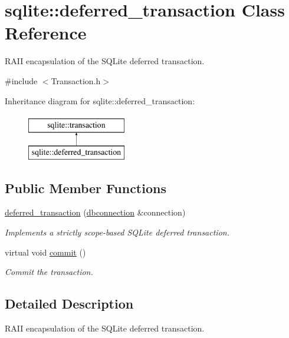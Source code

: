 \hypertarget{a00005}{\section{sqlite\-:\-:deferred\-\_\-transaction Class Reference}
\label{a00005}
}


R\-A\-I\-I encapsulation of the S\-Q\-Lite deferred transaction.  




{\ttfamily \#include $<$Transaction.\-h$>$}

Inheritance diagram for sqlite\-:\-:deferred\-\_\-transaction\-:\begin{figure}[H]
\begin{center}
\leavevmode
\includegraphics[height=2.000000cm]{a00005}
\end{center}
\end{figure}
\subsection*{Public Member Functions}
\begin{DoxyCompactItemize}
\item 
\hyperlink{a00005_a18666e756f66c6978bf435cf6b072be7}{deferred\-\_\-transaction} (\hyperlink{a00004}{dbconnection} \&connection)
\begin{DoxyCompactList}\small\item\em Implements a strictly scope-\/based S\-Q\-Lite deferred transaction. \end{DoxyCompactList}\item 
\hypertarget{a00014_abe219dd0bf949d569381f9830c7b2d1a}{virtual void \hyperlink{a00014_abe219dd0bf949d569381f9830c7b2d1a}{commit} ()}\label{a00014_abe219dd0bf949d569381f9830c7b2d1a}

\begin{DoxyCompactList}\small\item\em Commit the transaction. \end{DoxyCompactList}\end{DoxyCompactItemize}


\subsection{Detailed Description}
R\-A\-I\-I encapsulation of the S\-Q\-Lite deferred transaction. 

